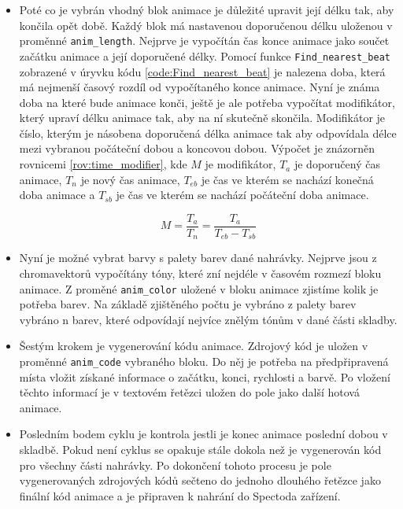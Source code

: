 \begin{itemize}
    \item Poté co je vybrán vhodný blok animace je důležité upravit její délku tak, aby končila opět době. Každý blok má nastavenou doporučenou délku uloženou v proměnné \texttt{anim\_length}. Nejprve je vypočítán čas konce animace jako součet začátku animace a její doporučené délky. Pomocí funkce \texttt{Find\_nearest\_beat} zobrazené v úryvku kódu \ref{code:Find_nearest_beat} je nalezena doba, která má nejmenší časový rozdíl od vypočítaného konce animace. Nyní je známa doba na které bude animace konči, ještě je ale potřeba vypočítat modifikátor, který upraví délku animace tak, aby na ní skutečně skončila. Modifikátor je číslo, kterým je násobena doporučená délka animace tak aby odpovídala délce mezi vybranou počáteční dobou a koncovou dobou. Výpočet je znázorněn rovnicemi \ref{rov:time_modifier}, kde $M$ je modifikátor, $T_a$ je doporučený čas animace, $T_n$ je nový čas animace, $T_{eb}$ je čas ve kterém se nachází konečná doba animace a $T_{sb}$ je čas ve kterém se nachází počáteční doba animace.
    
    \begin{equation}
        M = \frac{T_a}{T_n} = \frac{T_a}{T_{eb} - T_{sb}}
        \label{rov:time_modifier}
    \end{equation}
    
    \item Nyní je možné vybrat barvy s palety barev dané nahrávky. Nejprve jsou z chromavektorů vypočítány tóny, které zní nejdéle v časovém rozmezí bloku animace. Z proměné \texttt{anim\_color} uložené v bloku animace zjistíme kolik je potřeba barev. Na základě zjištěného počtu je vybráno z palety barev vybráno n barev, které odpovídají nejvíce znělým tónům v dané části skladby. 

    \item Šestým krokem je vygenerování kódu animace. Zdrojový kód je uložen v proměnné \texttt{anim\_code} vybraného bloku. Do něj je potřeba na předpřipravená místa vložit získané informace o začátku, konci, rychlosti a barvě. Po vložení těchto informací je v textovém řetězci uložen do pole jako další hotová animace. 
    
    \item Posledním bodem cyklu je kontrola jestli je konec animace poslední dobou v skladbě. Pokud není cyklus se opakuje stále dokola než je vygenerován kód pro všechny části nahrávky. Po dokončení tohoto procesu je pole vygenerovaných zdrojových kódů sečteno do jednoho dlouhého řetězce jako finální kód animace a je připraven k nahrání do Spectoda zařízení. 
    
\end{itemize}

